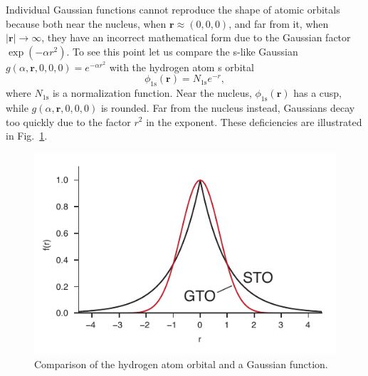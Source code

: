 \documentclass[../Main/chem532-notes.tex]{subfiles}
\begin{document}
Individual Gaussian functions cannot reproduce the shape of atomic orbitals because both near the nucleus, when $\mathbf{r} \approx (0,0,0)$, and far from it, when $|\mathbf{r}| \rightarrow \infty$, they have an incorrect mathematical form due to the Gaussian factor $\exp(-\alpha r^2)$.
To see this point let us compare the s-like Gaussian $g(\alpha, \mathbf{r},0,0,0) = e^{-\alpha r^2}$ with the hydrogen atom s orbital
\begin{equation}
\phi_{1\mathrm{s}}(\mathbf{r}) = N_{1\mathrm{s}} e^{- r},
\end{equation}
where $N_{1\mathrm{s}} $ is a normalization function.
Near the nucleus, $\phi_{1\mathrm{s}}(\mathbf{r})$ has a cusp, while $g(\alpha, \mathbf{r},0,0,0)$ is rounded.
Far from the nucleus instead, Gaussians decay too quickly due to the factor $r^2$ in the exponent. These deficiencies are illustrated in Fig.~\ref{fig:sto_vs_gto}.
\begin{figure}[htbp]
   \centering
   \includegraphics{sto_vs_gto.pdf} %
   \caption{Comparison of the hydrogen atom orbital and a Gaussian function.}
   \label{fig:sto_vs_gto}
\end{figure}
\end{document}

